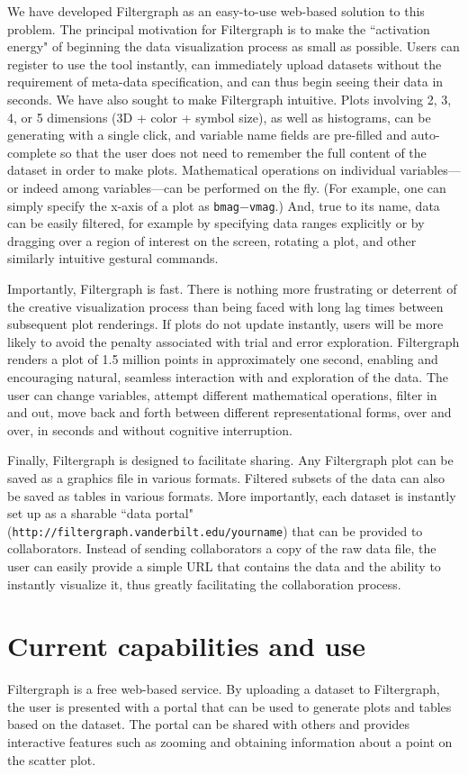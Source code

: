 \documentclass[11pt,twoside]{article}
\begin{document}
We have developed Filtergraph as an easy-to-use web-based solution to
this problem. The principal motivation for Filtergraph is to make the
``activation energy" of beginning the data visualization process as small
as possible. Users can register to use the tool instantly, can immediately
upload datasets without the requirement of meta-data specification, and
can thus begin seeing their data in seconds. We have also sought to
make Filtergraph intuitive. Plots involving 2, 3, 4, or 5 dimensions (3D +
color + symbol size), as well as histograms, can be generating with a single
click, and variable name fields are pre-filled and auto-complete so that
the user does not need to remember the full content of the dataset in order
to make plots. Mathematical operations on individual variables---or indeed
among variables---can be performed on the fly. (For example, one can simply
specify the x-axis of a plot as {\tt bmag}$-${\tt vmag}.) 
And, true to its name, data
can be easily filtered, for example by specifying data ranges explicitly
or by dragging over a region of interest on the screen, rotating a plot,
and other similarly intuitive gestural commands.

Importantly, Filtergraph is fast. There is nothing more frustrating
or deterrent of the creative visualization process than being faced
with long lag times between subsequent plot renderings. If plots do not
update instantly, users will be more likely to avoid the penalty
associated with trial and error exploration. Filtergraph renders a plot
of 1.5 million points in approximately one second, enabling and encouraging
natural, seamless interaction with and exploration of the data. The user
can change variables, attempt different mathematical operations, filter
in and out, move back and forth between different representational forms,
over and over, in seconds and without cognitive interruption.

Finally, Filtergraph is designed to facilitate sharing. Any Filtergraph plot
can be saved as a graphics file in various formats. Filtered subsets of
the data can also be saved as tables in various formats. More importantly,
each dataset is instantly set up as a sharable ``data portal" ({\tt http://filtergraph.vanderbilt.edu/yourname})
that can be provided to collaborators. Instead of sending collaborators a copy of
the raw data file, the user can easily provide a simple URL that contains the
data and the ability to instantly visualize it, thus greatly facilitating the collaboration process.

\section{Current capabilities and use}
Filtergraph is a free web-based service. By uploading a
dataset to Filtergraph, the user is presented with a portal that can be used to generate
plots and tables based on the dataset. The portal can be shared with others
and provides interactive features such as zooming and obtaining information
about a point on the scatter plot.
\end{document}
